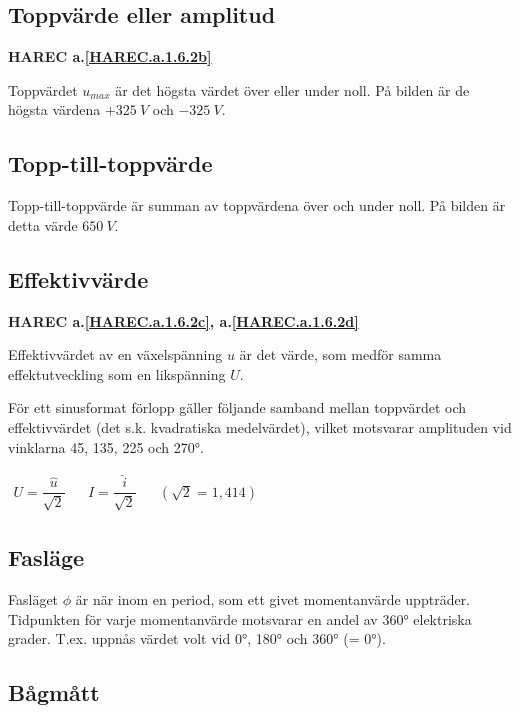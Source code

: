 \subsection{Toppvärde eller amplitud}
\textbf{HAREC a.\ref{HAREC.a.1.6.2b}\label{myHAREC.a.1.6.2b}}

Toppvärdet \(u_{max}\) är det högsta värdet över eller under noll. På bilden är
de högsta värdena \(+325\ V\) och \(-325\ V\).

\subsection{Topp-till-toppvärde}

Topp-till-toppvärde är summan av toppvärdena över och under noll. På bilden
är detta värde \(650\ V\).

\subsection{Effektivvärde}
\textbf{HAREC a.\ref{HAREC.a.1.6.2c}, a.\ref{HAREC.a.1.6.2d}\label{myHAREC.a.1.6.2c}\label{myHAREC.a.1.6.2d}}

Effektivvärdet av en växelspänning \(u\) är det värde, som medför samma
effektutveckling som en likspänning \(U\).

För ett sinusformat förlopp gäller följande samband mellan toppvärdet och
effektivvärdet (det s.k. kvadratiska medelvärdet), vilket motsvarar amplituden
vid vinklarna 45, 135, 225 och 270°.

\(
\begin{array}{lllll}
U=\dfrac{\hat{u}}{\sqrt{2}} & & I=\dfrac{\hat{i}}{\sqrt{2}} & & (\sqrt{2} = 1,414)
\end{array}
\)

\subsection{Fasläge}

Fasläget \(\phi\) är när inom en period, som ett givet momentanvärde uppträder.
Tidpunkten för varje momentanvärde motsvarar en andel av 360° elektriska
grader. T.ex. uppnås värdet volt vid 0°, 180° och 360° (= 0°).

\subsection{Bågmått}

